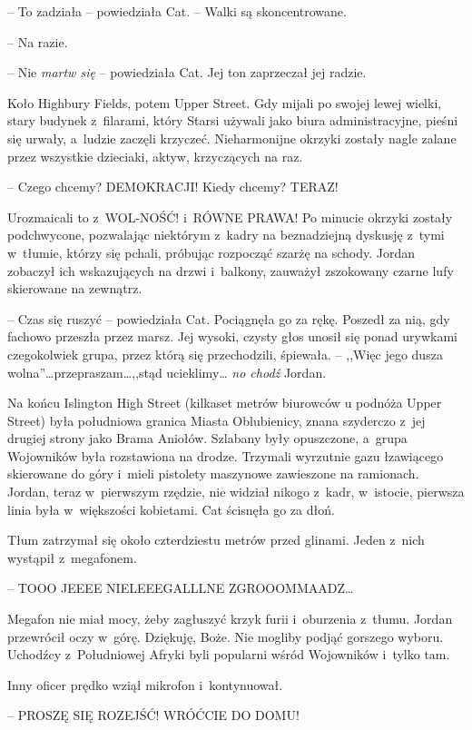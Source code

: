 \documentclass[oneside,polish,11pt,sfheadings]{mwbk}
\begin{document}
-- To zadziała -- powiedziała Cat. -- Walki są skoncentrowane.

-- Na razie.

-- Nie \emph{martw się} -- powiedziała Cat. Jej ton zaprzeczał jej radzie.

Koło Highbury Fields, potem Upper Street. Gdy mijali po swojej lewej
wielki, stary budynek z~filarami, który Starsi używali jako biura
administracyjne, pieśni się urwały, a~ludzie zaczęli krzyczeć.
Nieharmonijne okrzyki zostały nagle zalane przez wszystkie dzieciaki,
aktyw, krzyczących na raz.

-- Czego chcemy? DEMOKRACJI! Kiedy chcemy? TERAZ!

Urozmaicali to z~WOL-NOŚĆ! i~RÓWNE PRAWA! Po minucie okrzyki zostały
podchwycone, pozwalając niektórym z~kadry na beznadziejną dyskusję z~tymi w~tłumie, którzy się pchali, próbując rozpocząć szarżę na schody.
Jordan zobaczył ich wskazujących na drzwi i~balkony, zauważył zszokowany
czarne lufy skierowane na zewnątrz.

-- Czas się ruszyć -- powiedziała Cat. Pociągnęła go za rękę. Poszedł za
nią, gdy fachowo przeszła przez marsz. Jej wysoki, czysty głos unosił
się ponad urywkami czegokolwiek grupa, przez którą się przechodzili,
śpiewała. -- ,,Więc jego dusza wolna''\ldots przepraszam\ldots ,,stąd ucieklimy\ldots
\emph{no chodź} Jordan.

Na końcu Islington High Street (kilkaset metrów biurowców u podnóża
Upper Street) była południowa granica Miasta Oblubienicy, znana
szyderczo z~jej drugiej strony jako Brama Aniołów. Szlabany były
opuszczone, a~grupa Wojowników była rozstawiona na drodze. Trzymali
wyrzutnie gazu łzawiącego skierowane do góry i~mieli pistolety maszynowe
zawieszone na ramionach. Jordan, teraz w~pierwszym rzędzie, nie widział
nikogo z~kadr, w~istocie, pierwsza linia była w~większości kobietami.
Cat ścisnęła go za dłoń.

Tłum zatrzymał się około czterdziestu metrów przed glinami. Jeden z~nich
wystąpił z~megafonem.

-- TOOO JEEEE NIELEEEGALLLNE ZGROOOMMAADZ\ldots

Megafon nie miał mocy, żeby zagłuszyć krzyk furii i~oburzenia z~tłumu.
Jordan przewrócił oczy w~górę. Dziękuję, Boże. Nie mogliby podjąć
gorszego wyboru. Uchodźcy z~Południowej Afryki byli popularni wśród
Wojowników i~tylko tam.

Inny oficer prędko wziął mikrofon i~kontynuował.

-- PROSZĘ SIĘ ROZEJŚĆ! WRÓĆCIE DO DOMU!
\end{document}
